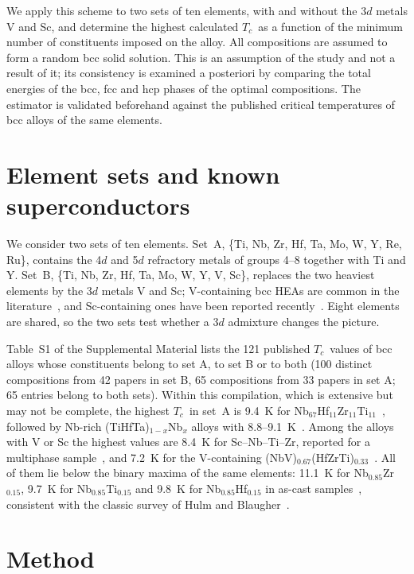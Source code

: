 \documentclass[aps,prb,reprint,superscriptaddress,twocolumn,floatfix]{revtex4-2}
\newcommand{\Tc}{$T_c$}
\begin{document}
We apply this scheme to two sets of ten elements, with and without the 3$d$ metals V and
Sc, and determine the highest calculated \Tc\ as a function of the minimum number of
constituents imposed on the alloy. All compositions are assumed to form a random bcc solid
solution. This is an assumption of the study and not a result of it; its consistency is
examined a posteriori by comparing the total energies of the bcc, fcc and hcp phases of the
optimal compositions. The estimator is validated beforehand against the published critical
temperatures of bcc alloys of the same elements.

\section{Element sets and known superconductors}
\label{sec:sets}

We consider two sets of ten elements. Set~A, \{Ti, Nb, Zr, Hf, Ta, Mo, W, Y, Re, Ru\},
contains the 4$d$ and 5$d$ refractory metals of groups 4--8 together with Ti and Y.
Set~B, \{Ti, Nb, Zr, Hf, Ta, Mo, W, Y, V, Sc\}, replaces the two heaviest elements by
the 3$d$ metals V and Sc; V-containing bcc HEAs are common in the
literature~\cite{lit_Ishizu_19102275,lit_Sharma_s9064801}, and Sc-containing ones have
been reported recently~\cite{lit_Sobota_06184512,lit_Sobota_50351820}. Eight elements are
shared, so the two sets test whether a 3$d$ admixture changes the picture.

Table~S1 of the Supplemental Material lists the 121 published \Tc\ values of bcc
alloys whose constituents belong to set A, to set B or to both (100 distinct
compositions from 42 papers in set B, 65 compositions from 33 papers in set A; 65 entries
belong to both sets). Within this compilation, which is extensive but may not
be complete, the highest \Tc\ in set~A is 9.4~K for
Nb$_{67}$Hf$_{11}$Zr$_{11}$Ti$_{11}$~\cite{lit_vonRohr_15926113}, followed by Nb-rich
(TiHfTa)$_{1-x}$Nb$_x$ alloys with 8.8--9.1~K~\cite{lit_Li_ad9fa8}. Among the alloys with V
or Sc the highest values are 8.4~K for Sc--Nb--Ti--Zr, reported for a multiphase
sample~\cite{lit_Krnel_15031122}, and 7.2~K for the V-containing
(NbV)$_{0.67}$(HfZrTi)$_{0.33}$~\cite{lit_vonRohr_15926113}. All of them lie below the binary maxima of the same elements: 11.1~K
for Nb$_{0.85}$Zr$_{0.15}$, 9.7~K for Nb$_{0.85}$Ti$_{0.15}$ and 9.8~K for
Nb$_{0.85}$Hf$_{0.15}$ in as-cast samples~\cite{Kushwaha2025}, consistent with the
classic survey of Hulm and Blaugher~\cite{Hulm1961}.

\section{Method}
\label{sec:method}
\end{document}
